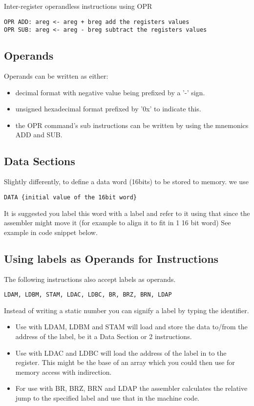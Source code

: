 \documentclass[10pt,a4paper]{article}
\begin{document}
Inter-register operandless instructions using OPR
\begin{verbatim}
OPR ADD: areg <- areg + breg add the registers values
OPR SUB: areg <- areg - breg subtract the registers values
\end{verbatim}

\subsection*{Operands}
Operands can be written as either:
\begin{itemize}
\item decimal format with negative value being prefixed by a '-' sign.
\item unsigned hexadecimal format prefixed by '0x' to indicate this.
\item the OPR command's sub instructions can be written by using the mnemonics ADD and SUB.
\end{itemize}

\subsection*{Data Sections}
Slightly differently, to define a data word (16bits) to be stored to memory.
we use 
\begin{verbatim}
DATA {initial value of the 16bit word}
\end{verbatim}

It is suggested you label this word with a label and refer to it using that since the assembler might move it (for example to align it to fit in 1 16 bit word) See example in code snippet below.

\subsection*{Using labels as Operands for Instructions}

The following instructions also accept labels as operands.

\begin{verbatim}LDAM, LDBM, STAM, LDAC, LDBC, BR, BRZ, BRN, LDAP\end{verbatim}

Instead of writing a static number you can signify a label by typing the identifier.

\begin{itemize}
\item Use with LDAM, LDBM and STAM will load and store the data to/from the address of the label, be it a Data Section or 2 instructions.

\item Use with LDAC and LDBC will load the address of the label in to the register. This might be the base of an array which you could then use for memory access with indirection. 

\item For use with BR, BRZ, BRN and LDAP the assembler calculates the relative jump to the specified label and use that in the machine code.
\end{itemize}
\end{document}
